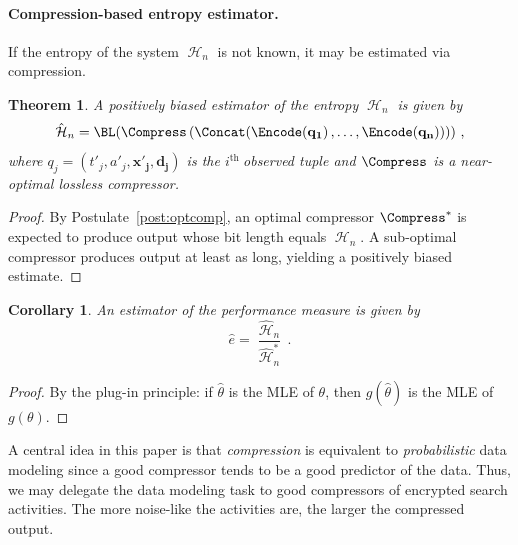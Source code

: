 \documentclass[final,11pt]{article}
\newcommand{\entropy}{\operatorname{\mathcal{H}}}
\newcommand{\ith}{$i^{\text{th }}$}
\renewcommand{\vec}[1]{\boldsymbol{\mathbf{#1}}}
\numberwithin{equation}{section}
\theoremstyle{plain}
\newtheorem{theorem}{Theorem}[section]
\newtheorem{corollary}{Corollary}[theorem]
\theoremstyle{remark}
\begin{document}
\paragraph{Compression-based entropy estimator.}
If the entropy of the system $\entropy_n$ is not known, it may be estimated via compression.
\begin{theorem}
A \emph{positively biased} estimator of the entropy $\entropy_n$ is given by
\begin{equation}
\label{eq:entropy_est}
    \hat{\entropy}_n =
    \BL\!\left(\Compress
        \left(
            \Concat\!
            \left(
                \Encode\!\left(\vec{q_1}\right),\ldots,\Encode\!\left(\vec{q_n}\right)
            \right)
        \right)
    \right)\,,
\end{equation}
where $q_j = \left(t'_j, a'_j, \vec{x'_j}, \vec{d_j}\right)$ is the \ith observed tuple and $\Compress$ is a \emph{near-optimal} lossless compressor.
\end{theorem}
\begin{proof}
By Postulate~\ref{post:optcomp}, an optimal compressor $\Compress^*$ is expected to produce output whose bit length equals $\entropy_n$. A sub-optimal compressor produces output at least as long, yielding a positively biased estimate.
\end{proof}


\begin{corollary}
An estimator of the performance measure is given by
\begin{equation}
    \hat{e} = \frac{\hat{\entropy}_n}{\hat{\entropy}_n^*}\,.
\end{equation}
\end{corollary}
\begin{proof}
By the plug-in principle: if $\hat{\theta}$ is the MLE of $\theta$, then $g(\hat{\theta})$ is the MLE of $g(\theta)$.
\end{proof}

A central idea in this paper is that \emph{compression} is equivalent to \emph{probabilistic} data modeling since a good compressor tends to be a good predictor of the data. Thus, we may delegate the data modeling task to good compressors of encrypted search activities. The more noise-like the activities are, the larger the compressed output.
\end{document}
